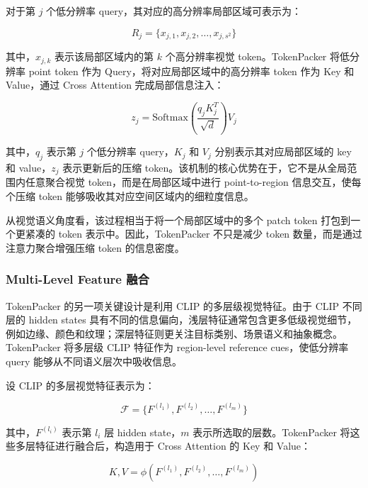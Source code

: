 对于第 $j$ 个低分辨率 query，其对应的高分辨率局部区域可表示为：

\begin{equation}
    \label{equ:region_feature}
    R_j=\{x_{j,1},x_{j,2},\dots,x_{j,s^2}\}
\end{equation}

其中，$x_{j,k}$ 表示该局部区域内的第 $k$ 个高分辨率视觉 token。TokenPacker 将低分辨率 point token 作为 Query，将对应局部区域中的高分辨率 token 作为 Key 和 Value，通过 Cross Attention 完成局部信息注入：

\begin{equation}
    \label{equ:tokenpacker_cross_attention}
    z_j=\mathrm{Softmax}\left(\frac{q_jK_j^T}{\sqrt{d}}\right)V_j
\end{equation}

其中，$q_j$ 表示第 $j$ 个低分辨率 query，$K_j$ 和 $V_j$ 分别表示其对应局部区域的 key 和 value，$z_j$ 表示更新后的压缩 token。该机制的核心优势在于，它不是从全局范围内任意聚合视觉 token，而是在局部区域中进行 point-to-region 信息交互，使每个压缩 token 能够吸收其对应空间区域内的细粒度信息。

从视觉语义角度看，该过程相当于将一个局部区域中的多个 patch token 打包到一个更紧凑的 token 表示中。因此，TokenPacker 不只是减少 token 数量，而是通过注意力聚合增强压缩 token 的信息密度。

\subsubsection{Multi-Level Feature 融合}

TokenPacker 的另一项关键设计是利用 CLIP 的多层级视觉特征。由于 CLIP 不同层的 hidden states 具有不同的信息偏向，浅层特征通常包含更多低级视觉细节，例如边缘、颜色和纹理；深层特征则更关注目标类别、场景语义和抽象概念。TokenPacker 将多层级 CLIP 特征作为 region-level reference cues，使低分辨率 query 能够从不同语义层次中吸收信息。

设 CLIP 的多层视觉特征表示为：

\begin{equation}
    \label{equ:multi_level_features}
    \mathcal{F}=\{F^{(l_1)},F^{(l_2)},\dots,F^{(l_m)}\}
\end{equation}

其中，$F^{(l_i)}$ 表示第 $l_i$ 层 hidden state，$m$ 表示所选取的层数。TokenPacker 将这些多层特征进行融合后，构造用于 Cross Attention 的 Key 和 Value：

\begin{equation}
    \label{equ:kv_multi_level}
    K,V=\phi(F^{(l_1)},F^{(l_2)},\dots,F^{(l_m)})
\end{equation}

